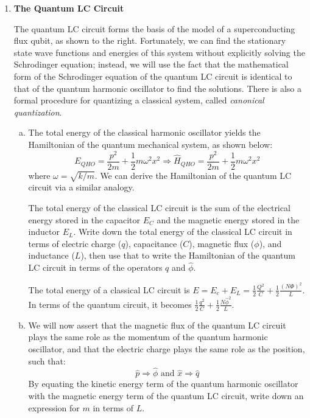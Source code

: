 \documentclass[10pt,letterpaper]{article}
\begin{document}
\begin{enumerate}
\begin{enumerate}[a)]
\end{enumerate}

\item \textbf{The Quantum LC Circuit}

The quantum LC circuit forms the basis of the model of a superconducting flux qubit, as shown to the right. Fortunately, we can find the stationary state wave functions and energies of this system without explicitly solving the Schrodinger equation; instead, we will use the fact that the mathematical form of the Schrodinger equation of the quantum LC circuit is identical to that of the quantum harmonic oscillator to find the solutions. There is also a formal procedure for quantizing a classical system, called \textit{canonical quantization}.

\begin{enumerate}[a)]

\item The total energy of the classical harmonic oscillator yields the Hamiltonian of the quantum mechanical system, as shown below:
$$E_{QHO} = \frac{p^{2}}{2m} + \frac{1}{2}m\omega^{2}x^{2} \Rightarrow \hat{H}_{QHO} = \frac{p^{2}}{2m} + \frac{1}{2}m\omega^{2}x^{2}$$
where $\omega = \sqrt{k/m}$. We can derive the Hamiltonian of the quantum LC circuit via a similar analogy.

The total energy of the classical LC circuit is the sum of the electrical energy stored in the capacitor $E_{C}$ and the magnetic energy stored in the inductor $E_{L}$. Write down the total energy of the classical LC circuit in terms of electric charge ($q$), capacitance ($C$), magnetic flux ($\phi$), and inductance ($L$), then use that to write the Hamiltonian of the quantum LC circuit in terms of the operators $q$ and $\hat{\phi}$. 

\color{violet}
The total energy of a classical LC circuit is $E = E_{c} + E_{L} = \frac{1}{2}\frac{Q^{2}}{C} + \frac{1}{2}\frac{(N\Phi)^{2}}{L}$. In terms of the quantum circuit, it becomes $\frac{1}{2}\frac{q^{2}}{C} + \frac{1}{2}\frac{N\hat{\phi}^{2}}{L}$. 
\color{black}

\item We will now assert that the magnetic flux of the quantum LC circuit plays the same role as the momentum of the quantum harmonic oscillator, and that the electric charge plays the same role as the position, such that:
$$\hat{p} \Rightarrow \hat{\phi} \text{ and } \hat{x} \Rightarrow \hat{q}$$
By equating the kinetic energy term of the quantum harmonic oscillator with the magnetic energy
term of the quantum LC circuit, write down an expression for $m$ in terms of $L$. 


\end{enumerate}
\end{enumerate}
\end{document}
